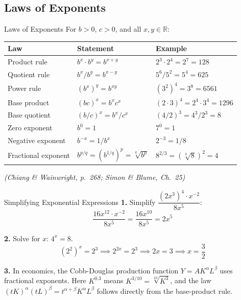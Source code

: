 \documentclass[12pt, a4paper]{article}
\theoremstyle{definition}
\newcommand{\R}{\mathbb{R}}
\begin{document}
\subsection{Laws of Exponents}

\begin{thmbox}{Laws of Exponents}
For $b > 0$, $c > 0$, and all $x, y \in \R$:
\begin{center}
\begin{tabular}{lll}
  \toprule
  \rowcolor{tabhead}
  \color{white}\textbf{Law} & \color{white}\textbf{Statement} & \color{white}\textbf{Example} \\
  \midrule
  Product rule & $b^x \cdot b^y = b^{x+y}$ & $2^3 \cdot 2^4 = 2^7 = 128$ \\
  \rowcolor{tabeven}
  Quotient rule & $b^x / b^y = b^{x-y}$ & $5^6 / 5^2 = 5^4 = 625$ \\
  Power rule & $(b^x)^y = b^{xy}$ & $(3^2)^4 = 3^8 = 6561$ \\
  \rowcolor{tabeven}
  Base product & $(bc)^x = b^x c^x$ & $(2 \cdot 3)^4 = 2^4 \cdot 3^4 = 1296$ \\
  Base quotient & $(b/c)^x = b^x / c^x$ & $(4/2)^3 = 4^3/2^3 = 8$ \\
  \rowcolor{tabeven}
  Zero exponent & $b^0 = 1$ & $7^0 = 1$ \\
  Negative exponent & $b^{-x} = 1/b^x$ & $2^{-3} = 1/8$ \\
  \rowcolor{tabeven}
  Fractional exponent & $b^{p/q} = (b^{1/q})^p = \sqrt[q]{b^p}$ & $8^{2/3} = (\sqrt[3]{8})^2 = 4$ \\
  \bottomrule
\end{tabular}
\end{center}
\emph{(Chiang \& Wainwright, p.\ 268; Simon \& Blume, Ch.\ 25)}
\end{thmbox}

\begin{exbox}{Simplifying Exponential Expressions}
\textbf{1.} Simplify $\dfrac{(2x^3)^4 \cdot x^{-2}}{8x^5}$:
\[
  \frac{16x^{12} \cdot x^{-2}}{8x^5}
  = \frac{16x^{10}}{8x^5}
  = 2x^5
\]

\textbf{2.} Solve for $x$: $4^x = 8$.
\[
  (2^2)^x = 2^3 \implies 2^{2x} = 2^3 \implies 2x = 3 \implies x = \frac{3}{2}
\]

\textbf{3.} In economics, the Cobb-Douglas production function
$Y = AK^\alpha L^\beta$ uses fractional exponents. Here $K^{0.3}$ means
$K^{3/10} = \sqrt[10]{K^3}$, and the law $(tK)^\alpha(tL)^\beta = t^{\alpha+\beta}K^\alpha L^\beta$ follows directly from the base-product rule.
\end{exbox}
\end{document}
